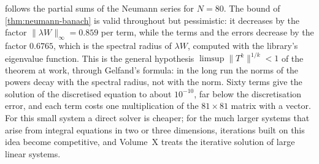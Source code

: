 \begin{table}
\end{table}

 follows the partial sums of the Neumann series for $N=80$. The bound of \cref{thm:neumann-banach} is valid throughout but pessimistic: it decreases by the factor $\|\lambda W\|_\infty=0.859$ per term, while the terms and the errors decrease by the factor $0.6765$, which is the spectral radius of $\lambda W$, computed with the library's eigenvalue function. This is the general hypothesis $\limsup\|T^k\|^{1/k}<1$ of the theorem at work, through Gelfand's formula: in the long run the norms of the powers decay with the spectral radius, not with the norm. Sixty terms give the solution of the discretised equation to about $10^{-10}$, far below the discretisation error, and each term costs one multiplication of the $81\times81$ matrix with a vector. For this small system a direct solver is cheaper; for the much larger systems that arise from integral equations in two or three dimensions, iterations built on this idea become competitive, and Volume~X treats the iterative solution of large linear systems.

